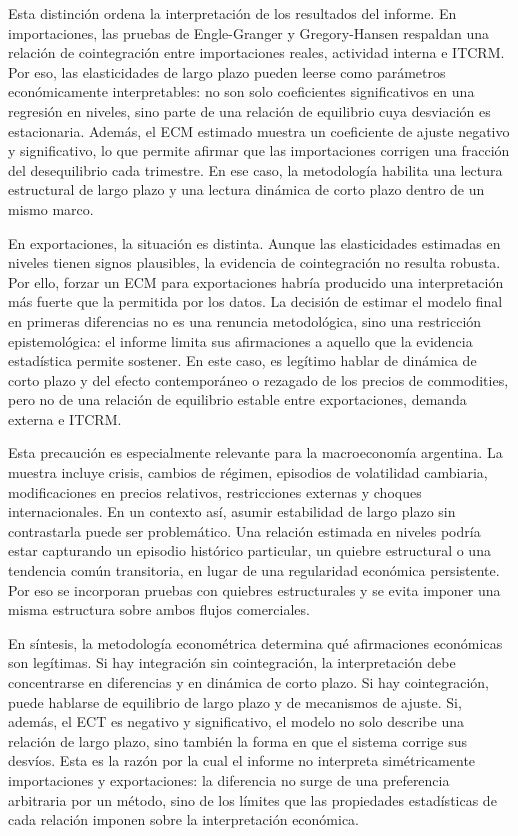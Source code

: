 \documentclass[11pt]{article}
\begin{document}
Esta distinción ordena la interpretación de los resultados del informe. En
importaciones, las pruebas de Engle-Granger y Gregory-Hansen respaldan una
relación de cointegración entre importaciones reales, actividad interna e
ITCRM. Por eso, las elasticidades de largo plazo pueden leerse como parámetros
económicamente interpretables: no son solo coeficientes significativos en una
regresión en niveles, sino parte de una relación de equilibrio cuya desviación
es estacionaria. Además, el ECM estimado muestra un coeficiente de ajuste
negativo y significativo, lo que permite afirmar que las importaciones corrigen
una fracción del desequilibrio cada trimestre. En ese caso, la metodología
habilita una lectura estructural de largo plazo y una lectura dinámica de corto
plazo dentro de un mismo marco.

En exportaciones, la situación es distinta. Aunque las elasticidades estimadas
en niveles tienen signos plausibles, la evidencia de cointegración no resulta
robusta. Por ello, forzar un ECM para exportaciones habría producido una
interpretación más fuerte que la permitida por los datos. La decisión de estimar
el modelo final en primeras diferencias no es una renuncia metodológica, sino
una restricción epistemológica: el informe limita sus afirmaciones a aquello que
la evidencia estadística permite sostener. En este caso, es legítimo hablar de
dinámica de corto plazo y del efecto contemporáneo o rezagado de los precios de
commodities, pero no de una relación de equilibrio estable entre exportaciones,
demanda externa e ITCRM.

Esta precaución es especialmente relevante para la macroeconomía argentina. La
muestra incluye crisis, cambios de régimen, episodios de volatilidad cambiaria,
modificaciones en precios relativos, restricciones externas y choques
internacionales. En un contexto así, asumir estabilidad de largo plazo sin
contrastarla puede ser problemático. Una relación estimada en niveles podría
estar capturando un episodio histórico particular, un quiebre estructural o una
tendencia común transitoria, en lugar de una regularidad económica persistente.
Por eso se incorporan pruebas con quiebres estructurales y se evita imponer una
misma estructura sobre ambos flujos comerciales.

En síntesis, la metodología econométrica determina qué afirmaciones económicas
son legítimas. Si hay integración sin cointegración, la interpretación debe
concentrarse en diferencias y en dinámica de corto plazo. Si hay cointegración,
puede hablarse de equilibrio de largo plazo y de mecanismos de ajuste. Si,
además, el ECT es negativo y significativo, el modelo no solo describe una
relación de largo plazo, sino también la forma en que el sistema corrige sus
desvíos. Esta es la razón por la cual el informe no interpreta simétricamente
importaciones y exportaciones: la diferencia no surge de una preferencia
arbitraria por un método, sino de los límites que las propiedades estadísticas
de cada relación imponen sobre la interpretación económica.
\end{document}
